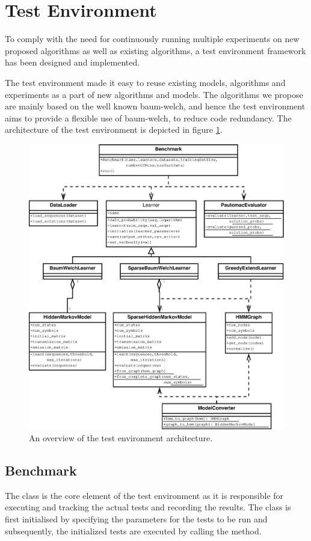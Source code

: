 \section{Test Environment}
To comply with the need for continuously running multiple experiments on new proposed algorithms as well as existing algorithms, a test environment framework has been designed and implemented.

The test environment made it easy to reuse existing models, algorithms and experiments as a part of new algorithms and models. 
The algorithms we propose are mainly based on the well known \gls{baum-welch}, and hence the test environment aims to provide a flexible use of \gls{baum-welch}, to reduce code redundancy.
The architecture of the test environment is depicted in figure \ref{fig:testenvironment}.

\begin{figure}[!htb]
\centering
\includegraphics[scale=.4]{pictures/test-environment-overview.eps}
\caption{An overview of the test environment architecture.}
\label{fig:testenvironment}
\end{figure}

\subsection{Benchmark}
The  class is the core element of the test environment as it is responsible for executing and tracking the actual tests and recording the results. The  class is first initialised by specifying the parameters for the tests to be run and subsequently, the initialized tests are executed by calling the  method.

